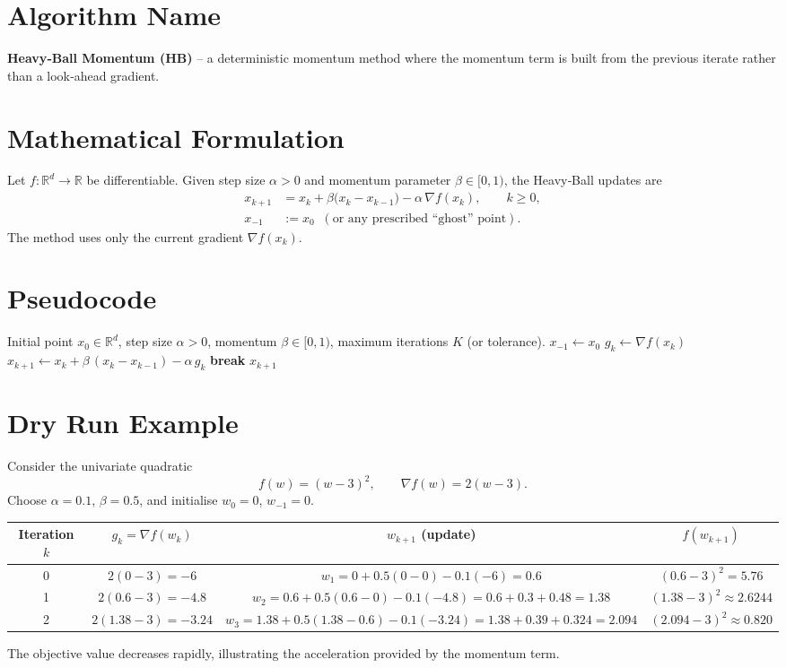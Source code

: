 \documentclass{article}
\newcommand{\grad}{\nabla}
\begin{document}
\section*{Algorithm Name}
\textbf{Heavy‑Ball Momentum (HB)} – a deterministic momentum method where the momentum term is built from the previous iterate rather than a look‑ahead gradient.

\section*{Mathematical Formulation}
Let $f:\mathbb{R}^d\rightarrow\mathbb{R}$ be differentiable.  Given step size $\alpha>0$ and momentum parameter $\beta\in[0,1)$, the Heavy‑Ball updates are
\[
\boxed{
\begin{aligned}
x_{k+1} &= x_k + \beta\bigl(x_k-x_{k-1}\bigr) - \alpha \,\grad f(x_k),\qquad k\ge 0,\\[4pt]
x_{-1} &:= x_0 \;\;(\text{or any prescribed ``ghost'' point}).
\end{aligned}}
\]
The method uses only the current gradient $\grad f(x_k)$.

\section*{Pseudocode}
\begin{algorithm}[H]
\caption{Heavy‑Ball Momentum}
\begin{algorithmic}[1]
\Require Initial point $x_0\in\mathbb{R}^d$, step size $\alpha>0$, momentum $\beta\in[0,1)$,
        maximum iterations $K$ (or tolerance).
\State $x_{-1}\gets x_0$ 
    \State $g_k \gets \grad f(x_k)$
    \State $x_{k+1} \gets x_k + \beta\,(x_k-x_{k-1}) - \alpha\, g_k$
        \State \textbf{break}
    \EndIf
\EndFor
\State \Return $x_{k+1}$
\end{algorithmic}
\end{algorithm}

\section*{Dry Run Example}
Consider the univariate quadratic
\[
f(w) = (w-3)^2,\qquad \grad f(w)=2(w-3).
\]
Choose $\alpha=0.1$, $\beta=0.5$, and initialise $w_0=0$, $w_{-1}=0$.

\begin{center}
\begin{tabular}{c|c|c|c}
Iteration $k$ & $g_k= \grad f(w_k)$ & $w_{k+1}$ (update) & $f(w_{k+1})$ \\ \hline
0 & $2(0-3)=-6$ &
$w_1 = 0 + 0.5(0-0) -0.1(-6)=0.6$ &
$(0.6-3)^2 = 5.76$ \\[4pt]
1 & $2(0.6-3)=-4.8$ &
$w_2 = 0.6 + 0.5(0.6-0) -0.1(-4.8)=0.6+0.3+0.48=1.38$ &
$(1.38-3)^2 \approx 2.6244$ \\[4pt]
2 & $2(1.38-3)=-3.24$ &
$w_3 = 1.38 + 0.5(1.38-0.6) -0.1(-3.24)
      =1.38+0.39+0.324=2.094$ &
$(2.094-3)^2 \approx 0.820$ 
\end{tabular}
\end{center}
The objective value decreases rapidly, illustrating the acceleration provided by the momentum term.
\end{document}
